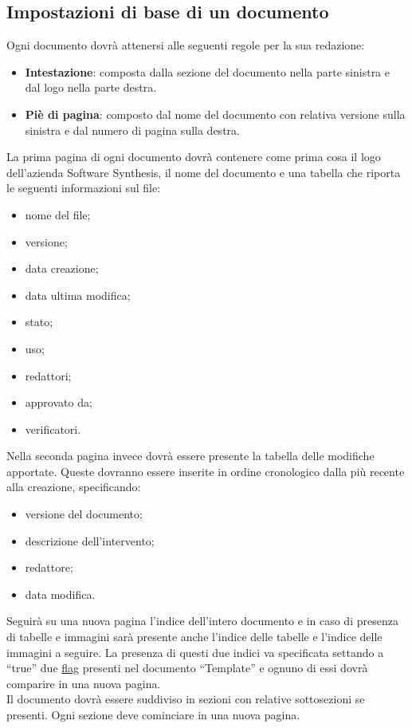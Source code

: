 \subsection{Impostazioni di base di un documento}
Ogni documento dovrà attenersi alle seguenti regole per la sua redazione:
\begin{itemize}
\item \textbf{Intestazione}: composta dalla sezione del documento nella parte sinistra e dal logo nella parte destra.
\item \textbf{Piè di pagina}: composto dal nome del documento con relativa versione sulla sinistra  e dal numero di pagina sulla destra.
\end{itemize}
La prima pagina di ogni documento dovrà contenere come prima cosa il logo dell'azienda Software Synthesis, il nome del documento e una tabella che riporta le seguenti informazioni sul file:
\begin{itemize}
\item nome del file;
\item versione;
\item data creazione;
\item data ultima modifica;
\item stato;
\item uso;
\item redattori;
\item approvato da;
\item verificatori.
\end{itemize}

Nella seconda pagina invece dovrà essere presente la tabella delle modifiche apportate. Queste dovranno essere inserite in ordine cronologico dalla più recente alla creazione, specificando:
\begin{itemize}
\item versione del documento;
\item descrizione dell'intervento;
\item redattore;
\item data modifica.
\end{itemize}
Seguirà su una nuova pagina l'indice dell'intero documento e in caso di presenza di tabelle e immagini sarà presente anche l'indice delle tabelle e l'indice delle immagini a seguire. La presenza di questi due indici va specificata settando a ``true'' due \underline{flag} presenti nel documento ``Template'' e ognuno di essi dovrà comparire in una nuova pagina.\\
Il documento dovrà essere suddiviso in sezioni con relative sottosezioni se presenti. Ogni sezione deve cominciare in una nuova pagina.

